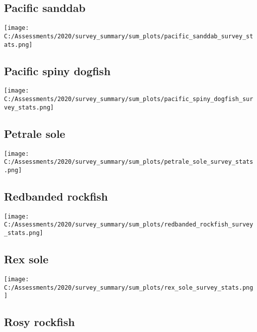 \documentclass[12pt,]{article}
\begin{document}
\hypertarget{pacific-sanddab}{%
\subsection{Pacific sanddab}\label{pacific-sanddab}}

\texttt{[image: C:/Assessments/2020/survey\_summary/sum\_plots/pacific\_sanddab\_survey\_stats.png]}
\FloatBarrier  

\hypertarget{pacific-spiny-dogfish}{%
\subsection{Pacific spiny dogfish}\label{pacific-spiny-dogfish}}

\texttt{[image: C:/Assessments/2020/survey\_summary/sum\_plots/pacific\_spiny\_dogfish\_survey\_stats.png]}
\FloatBarrier  

\hypertarget{petrale-sole}{%
\subsection{Petrale sole}\label{petrale-sole}}

\texttt{[image: C:/Assessments/2020/survey\_summary/sum\_plots/petrale\_sole\_survey\_stats.png]}
\FloatBarrier  

\hypertarget{redbanded-rockfish}{%
\subsection{Redbanded rockfish}\label{redbanded-rockfish}}

\texttt{[image: C:/Assessments/2020/survey\_summary/sum\_plots/redbanded\_rockfish\_survey\_stats.png]}
\FloatBarrier  

\hypertarget{rex-sole}{%
\subsection{Rex sole}\label{rex-sole}}

\texttt{[image: C:/Assessments/2020/survey\_summary/sum\_plots/rex\_sole\_survey\_stats.png]}
\FloatBarrier  

\hypertarget{rosy-rockfish}{%
\subsection{Rosy rockfish}\label{rosy-rockfish}}
\end{document}
